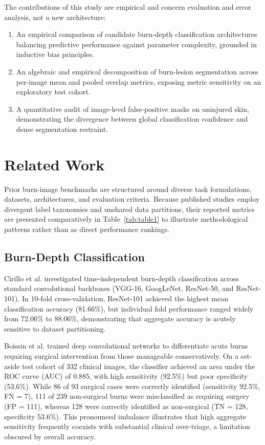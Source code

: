 \documentclass[11pt,a4paper]{article}
\begin{document}
The contributions of this study are empirical and concern evaluation and error analysis, not a new architecture:

\begin{enumerate}
  \item An empirical comparison of candidate burn-depth classification architectures balancing predictive performance against parameter complexity, grounded in inductive bias principles.
  \item An algebraic and empirical decomposition of burn-lesion segmentation across per-image mean and pooled overlap metrics, exposing metric sensitivity on an exploratory test cohort.
  \item A quantitative audit of image-level false-positive masks on uninjured skin, demonstrating the divergence between global classification confidence and dense segmentation restraint.
\end{enumerate}

\section{Related Work}

Prior burn-image benchmarks are structured around diverse task formulations, datasets, architectures, and evaluation criteria. Because published studies employ divergent label taxonomies and unshared data partitions, their reported metrics are presented comparatively in Table~\ref{tab:table1} to illustrate methodological patterns rather than as direct performance rankings.

\subsection{Burn-Depth Classification}

Cirillo et al. \cite{cirillo2019} investigated time-independent burn-depth classification across standard convolutional backbones (VGG-16, GoogLeNet, ResNet-50, and ResNet-101). In 10-fold cross-validation, ResNet-101 achieved the highest mean classification accuracy (81.66\%), but individual fold performance ranged widely from 72.06\% to 88.06\%, demonstrating that aggregate accuracy is acutely sensitive to dataset partitioning.

Boissin et al. \cite{boissin2023} trained deep convolutional networks to differentiate acute burns requiring surgical intervention from those manageable conservatively. On a set-aside test cohort of 332 clinical images, the classifier achieved an area under the ROC curve (AUC) of 0.885, with high sensitivity (92.5\%) but poor specificity (53.6\%). While 86 of 93 surgical cases were correctly identified (sensitivity 92.5\%, FN = 7), 111 of 239 non-surgical burns were misclassified as requiring surgery (FP = 111), whereas 128 were correctly identified as non-surgical (TN = 128, specificity 53.6\%). This pronounced imbalance illustrates that high aggregate sensitivity frequently coexists with substantial clinical over-triage, a limitation obscured by overall accuracy.
\end{document}
